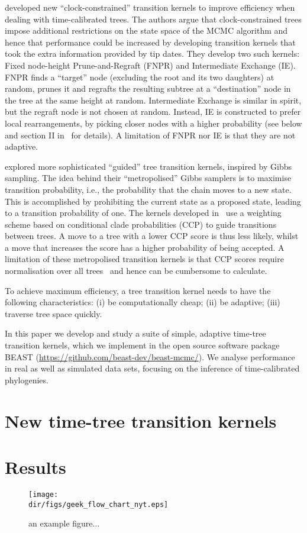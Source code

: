 \cite{Hoehna2008} developed new ``clock-constrained'' transition kernels to improve efficiency when dealing with time-calibrated trees. 
The authors argue that clock-constrained trees impose additional restrictions on the state space of the MCMC algorithm and hence that performance could be increased by developing transition kernels that took the extra information provided by tip dates.
They develop two such kernels: Fixed node-height Prune-and-Regraft (FNPR) and Intermediate Exchange (IE).
FNPR finds a ``target'' node (excluding the root and its two daughters) at random, prunes it and regrafts the resulting subtree at a ``destination'' node in the tree at the same height at random.
Intermediate Exchange is similar in spirit, but the regraft node  is not chosen at random. 
Instead, IE is constructed to prefer local rearrangements, by picking closer nodes with a higher probability (see below and section II in~\cite{Hoehna2008} for details).
A limitation of FNPR nor IE is that they are not adaptive.

\cite{Hoehna2012} explored more sophisticated ``guided'' tree transition kernels, inspired by Gibbs sampling.
The idea behind their ``metropolised'' Gibbs samplers is to maximise transition probability, i.e., the probability that the chain moves to a new state.
This is accomplished by prohibiting the current state as a proposed state, leading to a transition probability of one.
The kernels developed in~\cite{Hoehna2012} use a weighting scheme based on conditional clade probabilities (CCP) to guide transitions between trees.
A move to a tree with a lower CCP score is thus less likely, whilst a move that increases the score has a higher probability of being accepted.
A limitation of these metropolised transition kernels is that CCP scores require normalisation over all trees~\citep{Larget2013} and hence can be cumbersome to calculate.

To achieve maximum efficiency, a tree transition kernel needs to have the following characteristics: (i) be computationally cheap; (ii) be adaptive; (iii) traverse tree space quickly.

In this paper we develop and study a suite of simple, adaptive time-tree transition kernels, which we implement in the open source software package BEAST (\url{https://github.com/beast-dev/beast-mcmc/}).
We analyse performance in real as well as simulated data sets, focusing on the inference of time-calibrated phylogenies.


\section*{New time-tree transition kernels}


\section*{Results}

\begin{figure}[htbp]
  \centering
  \texttt{[image: \\dir/figs/geek\_flow\_chart\_nyt.eps]}
  \caption{an example figure...}
  \label{fig.example}
\end{figure}

% 
